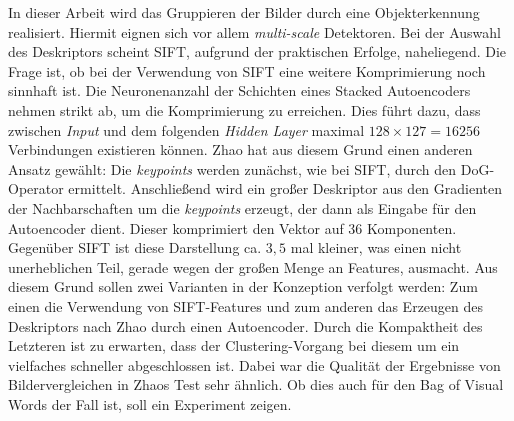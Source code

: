 In dieser Arbeit wird das Gruppieren der Bilder durch eine Objekterkennung realisiert. Hiermit eignen sich vor allem \textit{multi-scale} Detektoren. Bei der Auswahl des Deskriptors scheint SIFT, aufgrund der praktischen Erfolge, naheliegend. Die Frage ist, ob bei der Verwendung von SIFT eine weitere Komprimierung noch sinnhaft ist. Die Neuronenanzahl der Schichten eines Stacked Autoencoders nehmen strikt ab, um die Komprimierung zu erreichen. Dies führt dazu, dass zwischen \textit{Input} und dem folgenden \textit{Hidden Layer} maximal $128 \times 127 = 16256$ Verbindungen existieren können. Zhao \cite{aed2016} hat aus diesem Grund einen anderen Ansatz gewählt: Die \textit{keypoints} werden zunächst, wie bei SIFT, durch den DoG-Operator ermittelt. Anschließend wird ein großer Deskriptor aus den Gradienten der Nachbarschaften um die \textit{keypoints} erzeugt, der dann als Eingabe für den Autoencoder dient. Dieser komprimiert den Vektor auf 36 Komponenten. Gegenüber SIFT ist diese Darstellung ca. $3,5$ mal kleiner, was einen nicht unerheblichen Teil, gerade wegen der großen Menge an Features, ausmacht.\newline
Aus diesem Grund sollen zwei Varianten in der Konzeption verfolgt werden: Zum einen die Verwendung von SIFT-Features und zum anderen das Erzeugen des Deskriptors nach Zhao durch einen Autoencoder. Durch die Kompaktheit des Letzteren ist zu erwarten, dass der Clustering-Vorgang bei diesem um ein vielfaches schneller abgeschlossen ist. Dabei war die Qualität der Ergebnisse von Bildervergleichen in Zhaos Test sehr ähnlich. Ob dies auch für den Bag of Visual Words der Fall ist, soll ein Experiment zeigen.